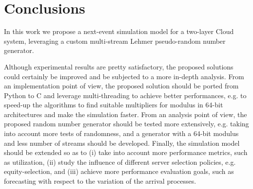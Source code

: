\section{Conclusions}
\label{sec:conclusions}

In this work we propose a next-event simulation model for a two-layer Cloud system, leveraging a custom multi-stream Lehmer pseudo-random number generator.

Although experimental results are pretty satisfactory, the proposed solutions could certainly be improved and be subjected to a more in-depth analysis.
%
From an implementation point of view, the proposed solution should be ported from Python to C and leverage multi-threading to achieve better performances, e.g. to speed-up the algorithms to find suitable multipliers for modulus in 64-bit architectures and make the simulation faster.
%
From an analysis point of view, the proposed random number generator should be tested more extensively, e.g. taking into account more tests of randomness, and a generator with a 64-bit modulus and less number of streams should be developed. 
%
Finally, the simulation model should be extended so as to 
(i) take into account more performance metrics, such as utilization, 
(ii) study the influence of different server selection policies, e.g. equity-selection, and 
(iii) achieve more performance evaluation goals, such as forecasting with respect to the variation of the arrival processes.
